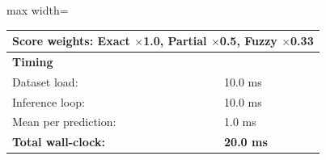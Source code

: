 \begin{table}[htbp]
\begin{adjustbox}{max width=\textwidth}
\begin{tabular}{r p{5cm} r r r r}
\multicolumn{6}{l}{Score weights: Exact $\times$1.0, Partial $\times$0.5, Fuzzy $\times$0.33} \\
\midrule
\multicolumn{6}{l}{\textbf{Timing}} \\
\midrule
\multicolumn{3}{l}{Dataset load:} & \multicolumn{3}{l}{10.0 ms} \\
\multicolumn{3}{l}{Inference loop:} & \multicolumn{3}{l}{10.0 ms} \\
\multicolumn{3}{l}{Mean per prediction:} & \multicolumn{3}{l}{1.0 ms} \\
\multicolumn{3}{l}{\textbf{Total wall-clock:}} & \multicolumn{3}{l}{\textbf{20.0 ms}} \\
\bottomrule
\end{tabular}
\end{adjustbox}
\end{table}
